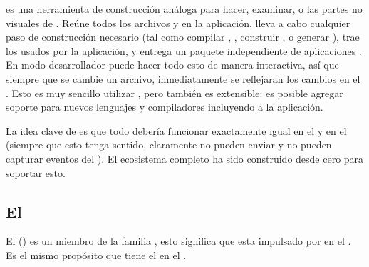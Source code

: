 \begin{itemize}
		\commandLinemeteor es una herramienta de construcción análoga para hacer, examinar, o las partes no visuales de \visualstudio. Reúne todos los archivos y \assetsAS en la aplicación, lleva a cabo cualquier paso de construcción necesario (tal como compilar \coffeescript, \minifying \cssNAME, construir \modulesAS \npm, o generar \sourcemaps), trae los \packagesAS usados por la aplicación, y entrega un paquete independiente de aplicaciones \readytorun. En modo desarrollador puede hacer todo esto de manera interactiva, así que siempre que se cambie un archivo, inmediatamente se reflejaran los cambios en el \browserINT. Esto es muy sencillo utilizar \outofthebox, pero también es extensible: es posible agregar soporte para nuevos lenguajes y compiladores incluyendo \buildPL \pluginAS \packagesAS a la aplicación.

\end{itemize}

La idea clave de \meteorNAME \packageAS \system es que todo debería funcionar exactamente igual en el \browserINT y en el \serverAS (siempre que esto tenga sentido, claramente \browsersINT no pueden enviar \emails y \serversAS no pueden capturar eventos del \mouse). El ecosistema completo ha sido construido desde cero para soportar esto.

\subsection{El \stackAS \meteorNAME}


El \stackAS \meteorNAME() es un miembro de la familia \meanstackNAME, esto significa que esta impulsado por \nodejsNAME en el \serverSideAS. Es el mismo propósito que tiene el \webserverINT \apacheNAME en el \stackAS \lampNAME.



